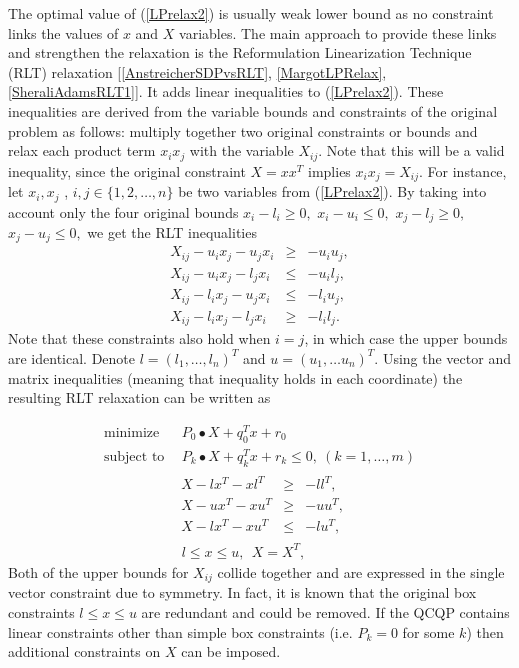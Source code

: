 \documentclass[12pt]{book}
\theoremstyle{definition}
\begin{document}
The optimal value of (\ref{LPrelax2}) is usually weak lower bound as no constraint links the values of $x$ and $X$ variables.
The main approach to provide these links and strengthen the relaxation is the Reformulation Linearization Technique (RLT) relaxation [\ref{AnstreicherSDPvsRLT}, \ref{MargotLPRelax}, \ref{SheraliAdamsRLT1}].
It adds linear inequalities to (\ref{LPrelax2}). These inequalities are derived from the variable bounds and 
constraints of the original problem as follows: multiply together two original constraints or bounds and relax 
each product term $x_ix_j$ with the variable $X_{ij}$. Note that this will be a valid inequality, since the original constraint $X=xx^T$ implies $x_ix_j = X_{ij}$. For instance, let $x_i, x_j$ , $i,j\in \{1, 2,\dots ,n\}$ be two variables from
(\ref{LPrelax2}). By taking into account only the four original bounds $x_i - l_i \geq 0,$ $x_i - u_i \leq 0 ,$ $ x_j - l_j \geq 0,$  $ x_j - u_j \leq 0,$ we get the RLT inequalities
\begin{equation}
\begin{array}{lcl}
X_{ij} - u_ix_j - u_jx_i  &\geq & -u_iu_j ,\\
X_{ij} - u_ix_j - l_jx_i  &\leq & -u_il_j ,\\
X_{ij} - l_ix_j - u_jx_i  &\leq & -l_iu_j ,\\
X_{ij} - l_ix_j - l_jx_i   &\geq & -l_il_j .
\end{array}
\end{equation}
 Note that these constraints also hold when $i = j$, in which case the upper bounds are identical. Denote $l = (l_1,\dots ,l_n)^T$ and $u = (u_1,\dots u_n)^T.$
 Using the vector and matrix inequalities (meaning that inequality holds in each coordinate) the resulting RLT relaxation can be written as 
 
 \begin{equation}
\label{RLTrelax1} 
\begin{array}{ll}
\mbox{minimize}&\ \ P_0\bullet X + q_0^Tx + r_0\\
\mbox{subject to}&\ \ P_k\bullet X+ q_k^Tx + r_k \leq 0, \  (k = 1,\dots ,m)\\
		& \begin{array}{lcl}
		 X - lx^T - xl^T & \geq & -ll^T, \\
		 X - ux^T - xu^T & \geq & -uu^T, \\
		 X - lx^T - xu^T & \leq & -lu^T, 
		 \end{array}\\
 		&\ \ l\leq x \leq u, \ \  X = X^T,
\end{array} 
\end{equation}
Both of the upper bounds for $X_{ij}$ collide together and are expressed in the single vector constraint due to symmetry.
In fact, it is known that the original box constraints $l\leq x\leq u$ are redundant and could be removed.
If the QCQP contains linear constraints other than simple box constraints (i.e. $P_k=0$ for some $k$) then additional constraints on $X$ can be imposed.
\end{document}
